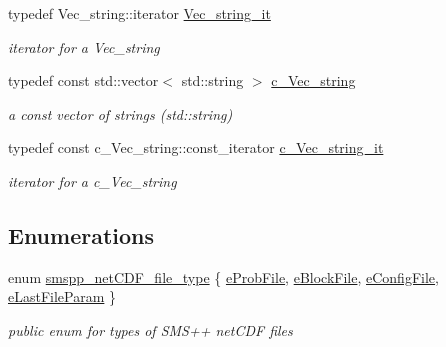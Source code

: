 \begin{DoxyCompactItemize}
typedef Vec\+\_\+string\+::iterator \mbox{\hyperlink{group___s_m_s__types_ga783dae6575f12fd7e90ad2edbf10f55c}{Vec\+\_\+string\+\_\+it}}
\begin{DoxyCompactList}\small\item\em iterator for a Vec\+\_\+string \end{DoxyCompactList}\item 
\mbox{\label{group___s_m_s__types_ga4eb8b5e087882b48fc77ba2a18267301}} 
typedef const std\+::vector$<$ std\+::string $>$ \mbox{\hyperlink{group___s_m_s__types_ga4eb8b5e087882b48fc77ba2a18267301}{c\+\_\+\+Vec\+\_\+string}}
\begin{DoxyCompactList}\small\item\em a const vector of strings (std\+::string) \end{DoxyCompactList}\item 
\mbox{\label{group___s_m_s__types_ga8d4579faf0785546f32b06f7416059f5}} 
typedef const c\+\_\+\+Vec\+\_\+string\+::const\+\_\+iterator \mbox{\hyperlink{group___s_m_s__types_ga8d4579faf0785546f32b06f7416059f5}{c\+\_\+\+Vec\+\_\+string\+\_\+it}}
\begin{DoxyCompactList}\small\item\em iterator for a c\+\_\+\+Vec\+\_\+string \end{DoxyCompactList}\end{DoxyCompactItemize}
\subsection*{Enumerations}
\begin{DoxyCompactItemize}
\item 
enum \mbox{\hyperlink{group___s_m_s__types_gab8fe98d4e6a9961e16ab25006d6eebd8}{smspp\+\_\+net\+C\+D\+F\+\_\+file\+\_\+type}} \{ \mbox{\hyperlink{group___s_m_s__types_ggab8fe98d4e6a9961e16ab25006d6eebd8ab4763484df9e463c82bde775db014c10}{e\+Prob\+File}}, 
\mbox{\hyperlink{group___s_m_s__types_ggab8fe98d4e6a9961e16ab25006d6eebd8a02eebfacbaf656d7b12fdbb866b1b5a1}{e\+Block\+File}}, 
\mbox{\hyperlink{group___s_m_s__types_ggab8fe98d4e6a9961e16ab25006d6eebd8ac08898a33aa19aa77ff3795f37b917bb}{e\+Config\+File}}, 
\mbox{\hyperlink{group___s_m_s__types_ggab8fe98d4e6a9961e16ab25006d6eebd8a80428702d25dc6218902e0cdb084af56}{e\+Last\+File\+Param}}
 \}
\begin{DoxyCompactList}\small\item\em public enum for types of S\+M\+S++ net\+C\+DF files \end{DoxyCompactList}\end{DoxyCompactItemize}



